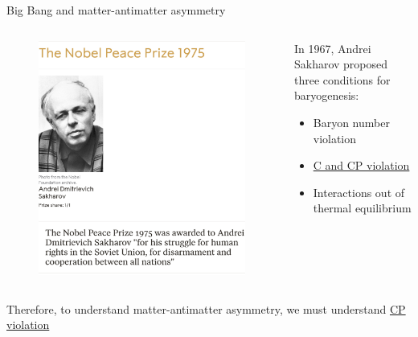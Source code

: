 \documentclass[dvipsnames]{beamer}
\begin{document}
\begin{frame}{Big Bang and matter-antimatter asymmetry}
  \begin{columns}
    \begin{column}{0.4\textwidth}
      \begin{figure}
        \includegraphics[width=1.0\textwidth]{Plots/NobelPeacePrize1975.png}
      \end{figure}
    \end{column}
    \begin{column}{0.6\textwidth}
      In 1967, Andrei Sakharov proposed three conditions for baryogenesis:
      \begin{itemize}
        \setlength\itemsep{1.0em}
        \item{Baryon number violation}
        \item{\underline{C and CP violation}}
        \item{Interactions out of thermal equilibrium}
      \end{itemize}
    \end{column}
  \end{columns}
  \vspace{0.5cm}
  \begin{center}
    \large Therefore, to understand matter-antimatter asymmetry, we must understand \underline{CP violation}
  \end{center}
\end{frame}
\end{document}
